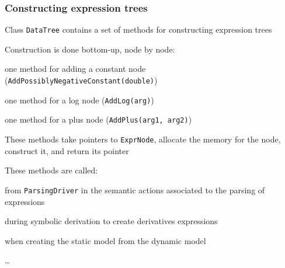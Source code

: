 \documentclass[aspectratio=169]{beamer}
\newenvironment{witemize}{\itemize\addtolength{\itemsep}{8pt}}{\enditemize}
\begin{document}
\begin{frame}
  \frametitle{Constructing expression trees}
  \begin{witemize}
  \item Class \texttt{DataTree} contains a set of methods for constructing expression trees
  \item Construction is done bottom-up, node by node:
    \begin{witemize}
    \item one method for adding a constant node (\texttt{AddPossiblyNegativeConstant(double)})
    \item one method for a log node (\texttt{AddLog(arg)})
    \item one method for a plus node (\texttt{AddPlus(arg1, arg2)})
    \end{witemize}
  \item These methods take pointers to \texttt{ExprNode}, allocate the memory for the node, construct it, and return its pointer
  \item These methods are called:
    \begin{witemize}
    \item from \texttt{ParsingDriver} in the semantic actions associated to the parsing of expressions
    \item during symbolic derivation to create derivatives expressions
    \item when creating the static model from the dynamic model
    \item \ldots
    \end{witemize}
  \end{witemize}
\end{frame}
\end{document}

